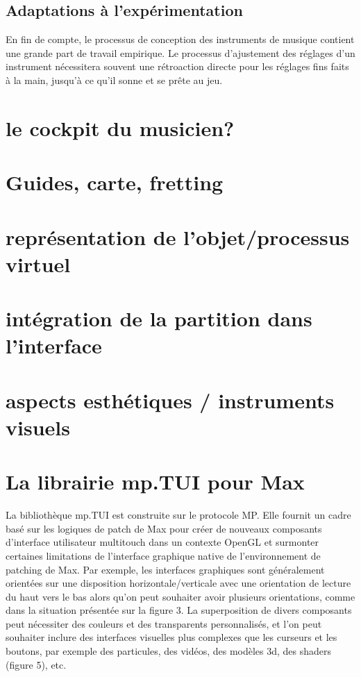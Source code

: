 \subsection{Adaptations à l'expérimentation}
En fin de compte, le processus de conception des instruments de musique contient une grande part de travail empirique. Le processus d'ajustement des réglages d'un instrument nécessitera souvent une rétroaction directe pour les réglages fins faits à la main, jusqu'à ce qu'il sonne et se prête au jeu.


\section{le cockpit du musicien?}
\label{sec:visual_representation:sec1}

\section{Guides, carte, fretting}

\section{représentation de l'objet/processus virtuel}

\section{intégration de la partition dans l'interface}

\section{aspects esthétiques / instruments visuels}

\section{La librairie mp.TUI pour Max}

La bibliothèque mp.TUI est construite sur le protocole MP. Elle fournit un cadre basé sur les logiques de patch de Max pour créer de nouveaux composants d'interface utilisateur multitouch dans un contexte OpenGL et surmonter certaines limitations de l'interface graphique native de l'environnement de patching de Max. Par exemple, les interfaces graphiques sont généralement orientées sur une disposition horizontale/verticale avec une orientation de lecture du haut vers le bas alors qu'on peut souhaiter avoir plusieurs orientations, comme dans la situation présentée sur la figure 3. La superposition de divers composants peut nécessiter des couleurs et des transparents personnalisés, et l'on peut souhaiter inclure des interfaces visuelles plus complexes que les curseurs et les boutons, par exemple des particules, des vidéos, des modèles 3d, des shaders (figure 5), etc.


